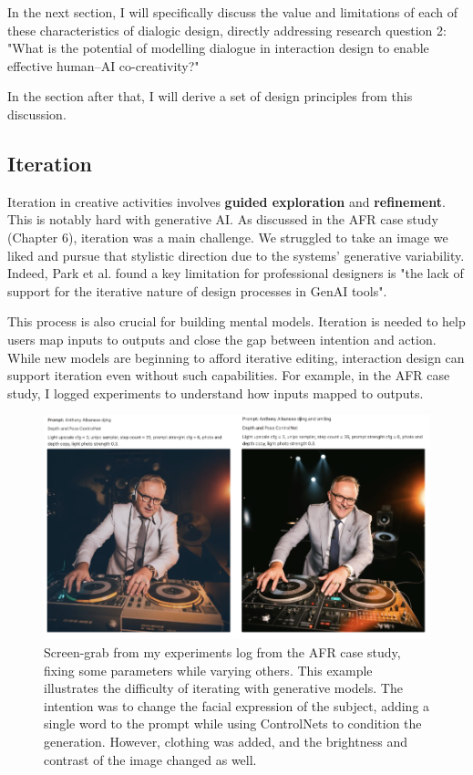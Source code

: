 In the next section, I will specifically discuss the value and limitations of each of these characteristics of dialogic design, directly addressing research question 2: "What is the potential of modelling dialogue in interaction design to enable effective human--AI co-creativity?"

In the section after that, I will derive a set of design principles from this discussion. 

\subsection{Iteration}
Iteration in creative activities involves \textbf{guided exploration} and \textbf{refinement}. This is notably hard with generative AI. As discussed in the AFR case study (Chapter 6), iteration was a main challenge. We struggled to take an image we liked and pursue that stylistic direction due to the systems' generative variability. Indeed, Park et al. \cite{Park2024-gw} found a key limitation for professional designers is "the lack of support for the iterative nature of design processes in GenAI tools".

This process is also crucial for building mental models. Iteration is needed to help users map inputs to outputs and close the gap between intention and action. While new models are beginning to afford iterative editing, interaction design can support iteration even without such capabilities. For example, in the AFR case study, I logged experiments to understand how inputs mapped to outputs.

\begin{figure}
    \centering
    \includegraphics[width=1\linewidth]{alboexperiments.png}
    \caption{Screen-grab from my experiments log from the AFR case study, fixing some parameters while varying others. This example illustrates the difficulty of iterating with generative models. The intention was to change the facial expression of the subject, adding a single word to the prompt while using ControlNets to condition the generation. However, clothing was added, and the brightness and contrast of the image changed as well.}
    \label{fig:albo_series}
\end{figure}

